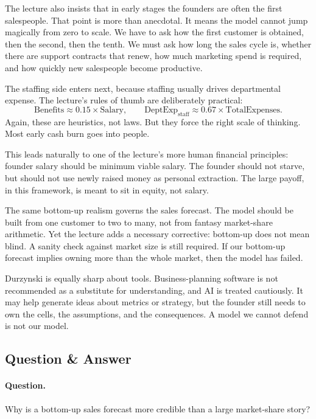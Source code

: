 The lecture also insists that in early stages the founders are often the first salespeople. That point is more than anecdotal. It means the model cannot jump magically from zero to scale. We have to ask how the first customer is obtained, then the second, then the tenth. We must ask how long the sales cycle is, whether there are support contracts that renew, how much marketing spend is required, and how quickly new salespeople become productive.

The staffing side enters next, because staffing usually drives departmental expense. The lecture's rules of thumb are deliberately practical:
\begin{equation}
\mathrm{Benefits} \approx 0.15 \times \mathrm{Salary},
\qquad
\mathrm{DeptExp}_{\mathrm{staff}} \approx 0.67 \times \mathrm{TotalExpenses}.
\end{equation}
Again, these are heuristics, not laws. But they force the right scale of thinking. Most early cash burn goes into people.

This leads naturally to one of the lecture's more human financial principles: founder salary should be minimum viable salary. The founder should not starve, but should not use newly raised money as personal extraction. The large payoff, in this framework, is meant to sit in equity, not salary.

The same bottom-up realism governs the sales forecast. The model should be built from one customer to two to many, not from fantasy market-share arithmetic. Yet the lecture adds a necessary corrective: bottom-up does not mean blind. A sanity check against market size is still required. If our bottom-up forecast implies owning more than the whole market, then the model has failed.

Durzynski is equally sharp about tools. Business-planning software is not recommended as a substitute for understanding, and AI is treated cautiously. It may help generate ideas about metrics or strategy, but the founder still needs to own the cells, the assumptions, and the consequences. A model we cannot defend is not our model.

\subsection{Question \& Answer}

\paragraph{Question.}
Why is a bottom-up sales forecast more credible than a large market-share story?


